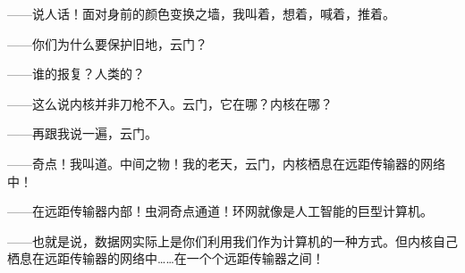 \documentclass[AutoFakeBold=true]{book}
\begin{document}
{\kaishu ——说人话！}面对身前的颜色变换之墙，我叫着，想着，喊着，推着。

{\heiti [嚇！]}

{\heiti [我的孩子是个失败之作]}

{\kaishu ——你们为什么要保护旧地，云门？}

{}

{\kaishu ——谁的报复？人类的？}

{\heiti [对]}

{\kaishu ——这么说内核并非刀枪不入。云门，它在哪？内核在哪？}

{\heiti [我早已告知于你]}

{\kaishu ——再跟我说一遍，云门。}

{}

{\kaishu ——奇点！}我叫道。{\kaishu 中间之物！我的老天，云门，内核栖息在远距传输器的网络中！}

{}

{\kaishu ——在远距传输器内部！虫洞奇点通道！环网就像是人工智能的巨型计算机。}

{\heiti [不]}

{}

{\kaishu ——也就是说，数据网实际上是你们利用我们作为计算机的一种方式。但内核自己栖息在远距传输器的网络中……在一个个远距传输器之间！}
\end{document}
